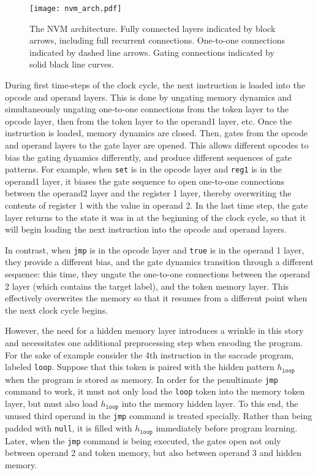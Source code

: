\documentclass[pdftex,12pt,letterpaper]{article}
\begin{document}
\begin{figure}[H]
\centering
\texttt{[image: nvm\_arch.pdf]}
\caption{The NVM architecture.  Fully connected layers indicated by block arrows, including full recurrent connections.  One-to-one connections indicated by dashed line arrows.  Gating connections indicated by solid black line curves.}
\label{fig:arch}
\end{figure}

During first time-steps of the clock cycle, the next instruction is loaded into the opcode and operand layers.  This is done by ungating memory dynamics and simultaneously ungating one-to-one connections from the token layer to the opcode layer, then from the token layer to the operand1 layer, etc.  Once the instruction is loaded, memory dynamics are closed.  Then, gates from the opcode and operand layers to the gate layer are opened.  This allows different opcodes to bias the gating dynamics differently, and produce different sequences of gate patterns.  For example, when \texttt{set} is in the opcode layer and \texttt{reg1} is in the operand1 layer, it biases the gate sequence to open one-to-one connections between the operand2 layer and the register 1 layer, thereby overwriting the contents of register 1 with the value in operand 2.  In the last time step, the gate layer returns to the state it was in at the beginning of the clock cycle, so that it will begin loading the next instruction into the opcode and operand layers.

In contrast, when \texttt{jmp} is in the opcode layer and \texttt{true} is in the operand 1 layer, they provide a different bias, and the gate dynamics transition through a different sequence:  this time, they ungate the one-to-one connections between the operand 2 layer (which contains the target label), and the token memory layer.  This effectively overwrites the memory so that it resumes from a different point when the next clock cycle begins.

However, the need for a hidden memory layer introduces a wrinkle in this story and necessitates one additional preprocessing step when encoding the program.  For the sake of example consider the 4th instruction in the saccade program, labeled \texttt{loop}.  Suppose that this token is paired with the hidden pattern \texttt{$h_\texttt{loop}$} when the program is stored as memory.  In order for the penultimate \texttt{jmp} command to work, it must not only load the \texttt{loop} token into the memory token layer, but must also load \texttt{$h_\texttt{loop}$} into the memory hidden layer.  To this end, the unused third operand in the \texttt{jmp} command is treated specially.  Rather than being padded with \texttt{null}, it is filled with \texttt{$h_\texttt{loop}$} immediately before program learning.  Later, when the \texttt{jmp} command is being executed, the gates open not only between operand 2 and token memory, but also between operand 3 and hidden memory.
\end{document}
